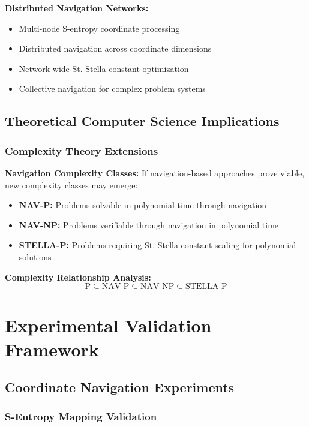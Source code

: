 \documentclass[11pt]{article}
\begin{document}
\textbf{Distributed Navigation Networks:}
\begin{itemize}
\item Multi-node S-entropy coordinate processing
\item Distributed navigation across coordinate dimensions
\item Network-wide St. Stella constant optimization
\item Collective navigation for complex problem systems
\end{itemize}

\subsection{Theoretical Computer Science Implications}

\subsubsection{Complexity Theory Extensions}

\textbf{Navigation Complexity Classes:}
If navigation-based approaches prove viable, new complexity classes may emerge:
\begin{itemize}
\item \textbf{NAV-P:} Problems solvable in polynomial time through navigation
\item \textbf{NAV-NP:} Problems verifiable through navigation in polynomial time
\item \textbf{STELLA-P:} Problems requiring St. Stella constant scaling for polynomial solutions
\end{itemize}

\textbf{Complexity Relationship Analysis:}
\begin{equation}
\text{P} \subseteq \text{NAV-P} \subseteq \text{NAV-NP} \subseteq \text{STELLA-P}
\label{eq:complexity_relationships}
\end{equation}

\section{Experimental Validation Framework}

\subsection{Coordinate Navigation Experiments}

\subsubsection{S-Entropy Mapping Validation}
\end{document}
